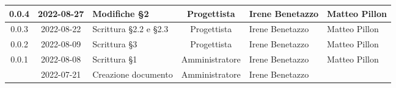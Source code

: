 \begin{center}
\begin{longtable}{ |c|c|p{8em}|c|m{5em}|m{6em}| }
	\hline
	0.0.4 & 2022-08-27 & Modifiche §2 & Progettista & Irene \newline Benetazzo & Matteo \newline Pillon \\ 
	\hline
	0.0.3 & 2022-08-22 & Scrittura §2.2 e §2.3 & Progettista & Irene \newline Benetazzo & Matteo Pillon\\ 
	\hline
    0.0.2 & 2022-08-09 & Scrittura §3 & Progettista & Irene \newline Benetazzo & Matteo \newline Pillon \\ 
	\hline
	0.0.1 & 2022-08-08 & Scrittura §1 & Amministratore & Irene \newline Benetazzo & Matteo Pillon\\ 
	\hline
	& 2022-07-21 & Creazione documento & Amministratore & Irene \newline Benetazzo & \\ 
	\hline
	\end{longtable}
	\end{center}
	\newpage
